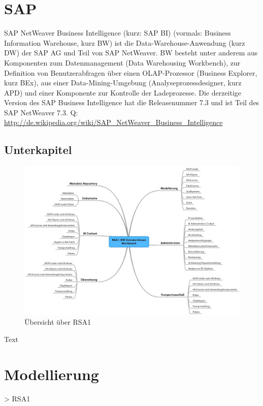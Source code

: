 \chapter{SAP}
\label{Kapitel:Einleitung}

SAP NetWeaver Business Intelligence (kurz: SAP BI) (vormals: Business Information Warehouse, kurz BW) ist die Data-Warehouse-Anwendung (kurz DW) der SAP AG und Teil von SAP NetWeaver. BW besteht unter anderem aus Komponenten zum Datenmanagement (Data Warehousing Workbench), zur Definition von Benutzerabfragen über einen OLAP-Prozessor (Business Explorer, kurz BEx), aus einer Data-Mining-Umgebung (Analyseprozessdesigner, kurz APD) und einer Komponente zur Kontrolle der Ladeprozesse. Die derzeitige Version des SAP Business Intelligence hat die Releasenummer 7.3 und ist Teil des SAP NetWeaver 7.3. 
Q: \url{http://de.wikipedia.org/wiki/SAP_NetWeaver_Business_Intelligence}


\section{Unterkapitel}
\label{Abschnitt:Motivation}




\begin{figure}[H]
    \centering
    \includegraphics[width=1\textwidth]{files/RSA1Mindmap}
    \caption{Übersicht über RSA1}
    \label{pic:DWOverview}
\end{figure}





Text

\chapter{Modellierung}
> RSA1\\



